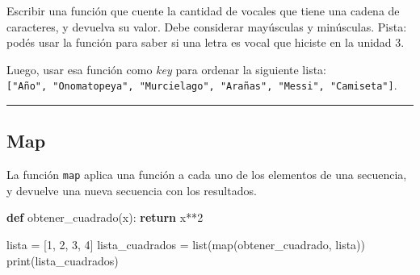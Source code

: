 \documentclass[
  letterpaper,
  DIV=11,
  numbers=noendperiod]{scrreprt}
\newenvironment{Shaded}{\begin{snugshade}}{\end{snugshade}}
\newcommand{\BuiltInTok}[1]{\textcolor[rgb]{0.00,0.23,0.31}{#1}}
\newcommand{\ControlFlowTok}[1]{\textcolor[rgb]{0.00,0.23,0.31}{\textbf{#1}}}
\newcommand{\DecValTok}[1]{\textcolor[rgb]{0.68,0.00,0.00}{#1}}
\newcommand{\KeywordTok}[1]{\textcolor[rgb]{0.00,0.23,0.31}{\textbf{#1}}}
\newcommand{\NormalTok}[1]{\textcolor[rgb]{0.00,0.23,0.31}{#1}}
\newcommand{\OperatorTok}[1]{\textcolor[rgb]{0.37,0.37,0.37}{#1}}
\begin{document}
\begin{tcolorbox}[enhanced jigsaw, opacitybacktitle=0.6, toptitle=1mm, toprule=.15mm, arc=.35mm, breakable, bottomrule=.15mm, opacityback=0, leftrule=.75mm, rightrule=.15mm, title=\textcolor{quarto-callout-important-color}{\faExclamation}\hspace{0.5em}{Ejercicio Desafío}, left=2mm, bottomtitle=1mm, colframe=quarto-callout-important-color-frame, colback=white, titlerule=0mm, coltitle=black, colbacktitle=quarto-callout-important-color!10!white]

Escribir una función que cuente la cantidad de vocales que tiene una
cadena de caracteres, y devuelva su valor. Debe considerar mayúsculas y
minúsculas. Pista: podés usar la función para saber si una letra es
vocal que hiciste en la unidad 3.

Luego, usar esa función como \emph{key} para ordenar la siguiente lista:
\texttt{{[}"Año",\ "Onomatopeya",\ "Murcielago",\ "Arañas",\ "Messi",\ "Camiseta"{]}}.\\

\end{tcolorbox}

\hfill\break

\begin{center}\rule{0.5\linewidth}{0.5pt}\end{center}

\hfill\break

\subsection{Map}\label{map}

La función \texttt{map} aplica una función a cada uno de los elementos
de una secuencia, y devuelve una nueva secuencia con los resultados.

\begin{Shaded}
\begin{Highlighting}[]
\KeywordTok{def}\NormalTok{ obtener\_cuadrado(x):}
  \ControlFlowTok{return}\NormalTok{ x}\OperatorTok{**}\DecValTok{2}

\NormalTok{lista }\OperatorTok{=}\NormalTok{ [}\DecValTok{1}\NormalTok{, }\DecValTok{2}\NormalTok{, }\DecValTok{3}\NormalTok{, }\DecValTok{4}\NormalTok{]}
\NormalTok{lista\_cuadrados }\OperatorTok{=} \BuiltInTok{list}\NormalTok{(}\BuiltInTok{map}\NormalTok{(obtener\_cuadrado, lista))}
\BuiltInTok{print}\NormalTok{(lista\_cuadrados)}
\end{Highlighting}
\end{Shaded}
\end{document}
